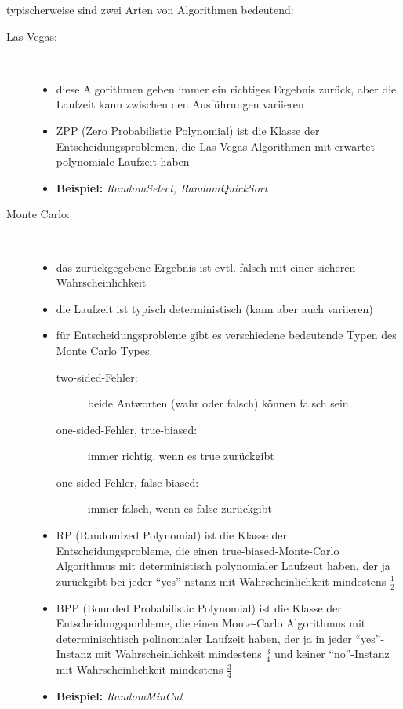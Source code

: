 typischerweise sind zwei Arten von  Algorithmen bedeutend:
\begin{description}
	\item[Las Vegas:]\ \\\up
		\begin{itemize}
			\item diese Algorithmen geben immer ein richtiges Ergebnis zurück, aber die Laufzeit kann zwischen den Ausführungen variieren
			\item ZPP (Zero Probabilistic Polynomial) ist die Klasse der Entscheidungsproblemen, die Las Vegas Algorithmen mit erwartet polynomiale Laufzeit haben
			\item \textbf{Beispiel:} \textit{RandomSelect, RandomQuickSort}
		\end{itemize}
	\item[Monte Carlo:] \ \\\up
		\begin{itemize}
			\item das zurückgegebene Ergebnis ist evtl. falsch mit einer sicheren Wahrscheinlichkeit
			\item die Laufzeit ist typisch deterministisch (kann aber auch variieren)
			\item für Entscheidungsprobleme gibt es verschiedene bedeutende Typen des Monte Carlo Types:
				\begin{description}
					\item[two-sided-Fehler:] beide Antworten (wahr oder falsch) können falsch sein
					\item[one-sided-Fehler, true-biased:] immer richtig, wenn es true zurückgibt
					\item[one-sided-Fehler, false-biased:] immer falsch, wenn es false zurückgibt
				\end{description}
			\item RP (Randomized Polynomial) ist die Klasse der Entscheidungsprobleme, die einen true-biased-Monte-Carlo Algorithmus mit deterministisch polynomialer Laufzeut haben, der ja zurückgibt bei jeder ``yes''-nstanz mit Wahrscheinlichkeit mindestens $\frac{1}{2}$
			\item BPP (Bounded Probabilistic Polynomial) ist die Klasse der Entscheidungsporbleme, die einen Monte-Carlo Algorithmus mit determinischtisch polinomialer Laufzeit haben, der ja in jeder ``yes''-Instanz mit Wahrscheinlichkeit mindestens $\frac{3}{4}$ und keiner ``no''-Instanz mit Wahrscheinlichkeit mindestens $\frac{3}{4}$
			\item \textbf{Beispiel:} \textit{RandomMinCut}
		\end{itemize}
\end{description}